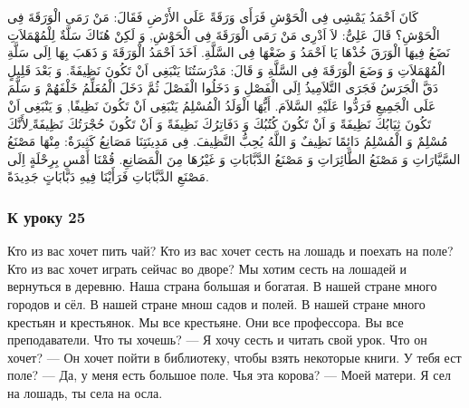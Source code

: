 \documentclass[a5paper]{article}
\begin{document}
كَانَ اَحْمَدُ يَمْشِى فِى الْحَوْشِ فَرَأَى وَرَقَةً عَلَى الأَرْضِ فَقَالَ: مَنْ رَمَى الْوَرَقَةَ فِى الْحَوْشِ؟ قَالَ عَلِىٌّ: لاَ اَدْرِى مَنْ رَمَى الْوَرَقَةَ فِى الْحَوْشِ, وَ لَكِنْ هُنَاكَ سَلَّةٌ لِلْمُهْمَلاَتِ نَضَعُ فِيهَا الْوَرَقَ خُذْهَا يَا اَحْمَدُ وَ ضَعْهَا فِى السَّلَّةِ. اَخَذَ اَحْمَدُ الْوَرَقَةَ وَ ذَهَبَ بِهَا اِلَى سَلَّةِ الْمُهْمَلاَتِ وَ وَضَعَ الْوَرَقَةَ فِى السَّلَّةِ وَ قَالَ: مَدْرَسَتُنَا يَنْبَغِى اَنْ تَكُونَ نَظِيفَةً. وَ بَعْدَ قَلِيلٍ دَقَّ الْجَرَسُ فَجَرَى التَّلاَمِيذُ اِلَى الْفَصْلِ وَ دَخَلُوا الْفَصْلَ ثُمَّ دَخَلَ الْمُعَلِّمُ خَلْفَهُمْ وَ سَلَّمَ عَلَى الْجَمِيعِ فَرَدُّوا عَلَيْهِ السَّلاَمَ. أَيُّهَا الْوَلَدُ الْمُسْلِمُ يَنْبَغِى اَنْ تَكُونَ نَظِيفًا, وَ يَنْبَغِى اَنْ تَكُونَ ثِيَابُكَ نَظِيفَةً وَ اَنْ تَكُونَ كُتُبُكَ وَ دَفَاتِرُكَ نَظِيفَةً وَ اَنْ تَكُونَ حُجْرَتُكَ نَظِيفَةً ِلأَنَّكَ مُسْلِمٌ وَ الْمُسْلِمُ دَائِمًا نَظِيفٌ وَ اللَّهُ يُحِبُّ النَّظِيفَ. فِى مَدِينَتِنَا مَصَانِعُ كَثِيرَةٌ: مِنْهَا مَصْنَعُ السَّيَّارَاتِ وَ مَصْنَعُ الطَّائِرَاتِ وَ مَصْنَعُ الدَّبَّابَاتِ وَ غَيْرُهَا مِنَ الْمَصَانِعِ. قُمْنَا أَمْسِ بِرِحْلَةٍ اِلَى مَصْنَعِ الدَّبَّابَاتِ فَرَأَيْنَا فِيهِ دَبَّابَاتٍ جَدِيدَةً.

\subsubsection{К уроку 25}
Кто из вас хочет пить чай? Кто из вас хочет сесть на лошадь и поехать на поле? Кто из вас хочет играть сейчас во дворе? Мы хотим сесть на лошадей и вернуться в деревню. Наша страна большая и богатая. В нашей стране много городов и сёл. В нашей стране мнош садов и полей. В нашей стране много крестьян и крестьянок. Мы все крестьяне. Они все профессора. Вы все преподаватели. Что ты хочешь? — Я хочу сесть и читать свой урок. Что он хочет? — Он хочет пойти в библиотеку, чтобы взять некоторые книги. У тебя ест поле? — Да, у меня есть большое поле. Чья эта корова? — Моей матери. Я сел на лошадь, ты села на осла.
\end{document}
